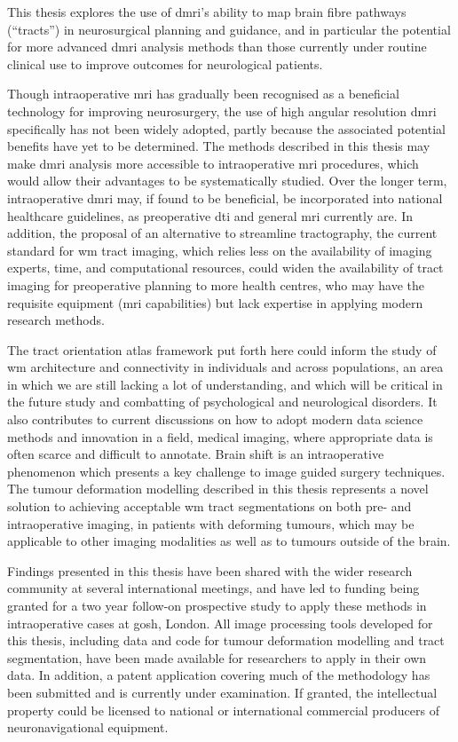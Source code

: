 \begin{impactstatement}

This thesis explores the use of \gls{dmri}'s ability to map brain fibre pathways (``tracts'') in neurosurgical planning and guidance, and in particular the potential for more advanced \gls{dmri} analysis methods than those currently under routine clinical use to improve outcomes for neurological patients.

Though intraoperative \gls{mri} has gradually been recognised as a beneficial technology for improving neurosurgery, the use of high angular resolution \gls{dmri} specifically has not been widely adopted, partly because the associated potential benefits have yet to be determined.
The methods described in this thesis may make \gls{dmri} analysis more accessible to intraoperative \gls{mri} procedures, which would allow their advantages to be systematically studied.
Over the longer term, intraoperative \gls{dmri} may, if found to be beneficial, be incorporated into national healthcare guidelines, as preoperative \gls{dti} and general \gls{mri} currently are.
In addition, the proposal of an alternative to streamline tractography, the current standard for \gls{wm} tract imaging, which relies less on the availability of imaging experts, time, and computational resources, could widen the availability of tract imaging for preoperative planning to more health centres, who may have the requisite equipment (\gls{mri} capabilities) but lack expertise in applying modern research methods.

The tract orientation atlas framework put forth here could inform the study of \gls{wm} architecture and connectivity in individuals and across populations, an area in which we are still lacking a lot of understanding, and which will be critical in the future study and combatting of psychological and neurological disorders.
It also contributes to current discussions on how to adopt modern data science methods and innovation in a field, medical imaging, where appropriate data is often scarce and difficult to annotate.
Brain shift is an intraoperative phenomenon which presents a key challenge to image guided surgery techniques.
The tumour deformation modelling described in this thesis represents a novel solution to achieving acceptable \gls{wm} tract segmentations on both pre- and intraoperative imaging, in patients with deforming tumours, which may be applicable to other imaging modalities as well as to tumours outside of the brain.

Findings presented in this thesis have been shared with the wider research community at several international meetings, and have led to funding being granted for a two year follow-on prospective study to apply these methods in intraoperative cases at \gls{gosh}, London.
All image processing tools developed for this thesis, including data and code for tumour deformation modelling and tract segmentation, have been made available for researchers to apply in their own data.
In addition, a patent application covering much of the methodology has been submitted and is currently under examination.
If granted, the intellectual property could be licensed to national or international commercial producers of neuronavigational equipment.


\end{impactstatement}
